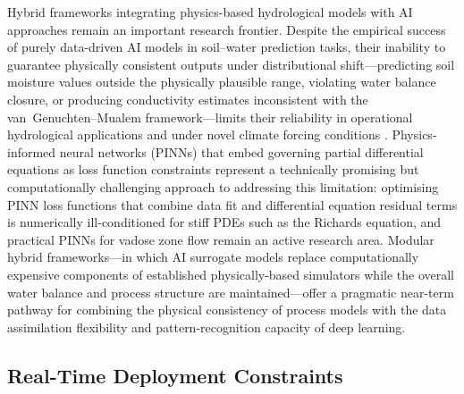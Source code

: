 \documentclass[land,article,submit,pdftex,moreauthors]{Definitions/mdpi}
\numberwithin{equation}{section}
\begin{document}
Hybrid frameworks integrating physics-based hydrological models with AI approaches remain an important research frontier. Despite the empirical success of purely data-driven AI models in soil--water prediction tasks, their inability to guarantee physically consistent outputs under distributional shift---predicting soil moisture values outside the physically plausible range, violating water balance closure, or producing conductivity estimates inconsistent with the van~Genuchten--Mualem framework---limits their reliability in operational hydrological applications and under novel climate forcing conditions \citep{willard2022integrating}. Physics-informed neural networks (PINNs) that embed governing partial differential equations as loss function constraints represent a technically promising but computationally challenging approach to addressing this limitation: optimising PINN loss functions that combine data fit and differential equation residual terms is numerically ill-conditioned for stiff PDEs such as the Richards equation, and practical PINNs for vadose zone flow remain an active research area. Modular hybrid frameworks---in which AI surrogate models replace computationally expensive components of established physically-based simulators while the overall water balance and process structure are maintained---offer a pragmatic near-term pathway for combining the physical consistency of process models with the data assimilation flexibility and pattern-recognition capacity of deep learning.

\subsection{Real-Time Deployment Constraints}
\end{document}

